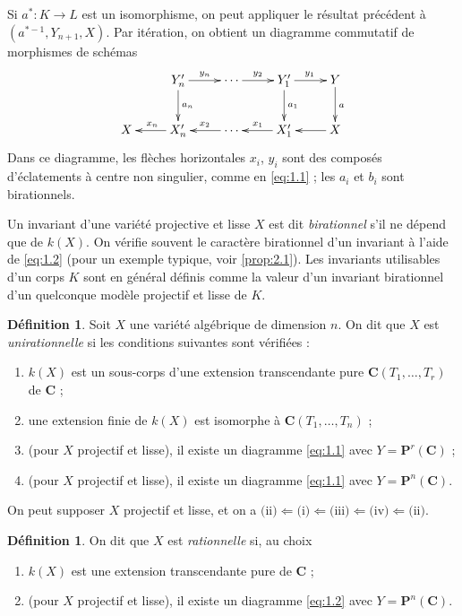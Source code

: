 \documentclass[12pt]{amsart}
\theoremstyle{plain}
\theoremstyle{definition}
\newtheorem{definition}[theoreme]{D\'efinition}
\theoremstyle{remark}
\begin{document}
Si $a^*: K \to L$ est un isomorphisme, on peut appliquer le r\'esultat pr\'ec\'edent
\`a $(a^{*-1}, Y_{n+1}, X)$. Par it\'eration, on obtient un diagramme commutatif de morphismes de sch\'emas
\begin{equation}\label{eq:1.2}
\xymatrix{
& Y_n' \ar[r]^{y_n} \ar[d]^{a_n} & \cdots \ar[r]^{y_2} & Y_1' \ar[r]^{y_1} \ar[d]^{a_1} & Y \ar[d]^{a} \\
X & X_n' \ar[l]_{x_n} & \cdots \ar[l]_{x_2} & X_1' \ar[l]_{x_1} & X \ar[l]
}
\end{equation}
Dans ce diagramme, les fl\`eches horizontales $x_i$, $y_i$ sont des compos\'es d'\'eclatements \`a centre non singulier, comme en \eqref{eq:1.1} ; les $a_i$ et $b_i$ sont birationnels.

Un invariant d'une vari\'et\'e projective et lisse $X$ est dit \textit{birationnel} s'il ne
d\'epend que de $k(X)$. On v\'erifie souvent le caract\`ere birationnel d'un invariant
\`a l'aide de \eqref{eq:1.2} (pour un exemple typique, voir \ref{prop:2.1}). Les invariants utilisables
d'un corps $K$ sont en g\'en\'eral d\'efinis comme la valeur d'un invariant birationnel
d'un quelconque mod\`ele projectif et lisse de $K$.

\begin{definition}\label{def:1.3}
Soit $X$ une vari\'et\'e alg\'ebrique de dimension $n$. On dit que $X$ est
\textit{unirationnelle} si les conditions suivantes sont v\'erifi\'ees :
\begin{enumerate}
\item[(i)] $k(X)$ est un sous-corps d'une extension transcendante pure $\mathbf{C}(T_1, \ldots, T_r)$
de $\mathbf{C}$ ;
\item[(ii)] une extension finie de $k(X)$ est isomorphe \`a $\mathbf{C}(T_1, \ldots, T_n)$ ;
\item[(iii)] (pour $X$ projectif et lisse), il existe un diagramme \eqref{eq:1.1} avec
$Y = \mathbf{P}^r(\mathbf{C})$ ;
\item[(iv)] (pour $X$ projectif et lisse), il existe un diagramme \eqref{eq:1.1} avec
$Y = \mathbf{P}^n(\mathbf{C})$.
\end{enumerate}
On peut supposer $X$ projectif et lisse, et on a $\text{(ii)} \Leftarrow \text{(i)} \Leftarrow \text{(iii)} \Leftarrow \text{(iv)} \Leftarrow \text{(ii)}$.
\end{definition}

\begin{definition}\label{def:1.4}
On dit que $X$ est \textit{rationnelle} si, au choix
\begin{enumerate}
\item[(i)] $k(X)$ est une extension transcendante pure de $\mathbf{C}$ ;
\item[(ii)] (pour $X$ projectif et lisse), il existe un diagramme \eqref{eq:1.2} avec
$Y = \mathbf{P}^n(\mathbf{C})$.
\end{enumerate}
\end{definition}
\end{document}

